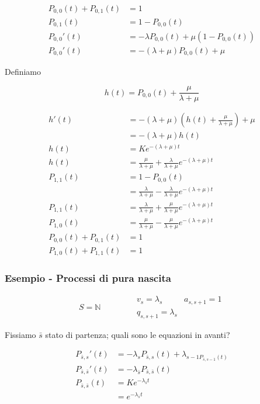 \documentclass[a4paper,12pt]{book}
\begin{document}
\begin{align*}
	P_{0,0}(t) + P_{0,1}(t) & = 1 \\
	P_{0,1}(t) & = 1 - P_{0,0}(t) \\
	P_{0,0}'(t) & = - \lambda P_{0,0}(t) + \mu(1 - P_{0,0}(t)) \\
	P_{0,0}'(t) & = -(\lambda + \mu)P_{0,0}(t) + \mu
\end{align*}

Definiamo 

$$ h(t) = P_{0,0}(t) + \frac{\mu}{\lambda + \mu} $$

\begin{align*}
	h'(t) & = -(\lambda + \mu)(h(t) + \frac{\mu}{\lambda + \mu}) + \mu \\
	& = -(\lambda + \mu) h(t) \\
	h(t) & = Ke^{-(\lambda + \mu)t} \\
	h(t) & = \frac{\mu}{\lambda + \mu} + \frac{\lambda}{\lambda + \mu}e^{-(\lambda + \mu)t} \\
	P_{1,1}(t) & = 1 - P_{0,0}(t) \\
	& = \frac{\lambda}{\lambda + \mu} - \frac{\lambda}{\lambda + \mu} e^{-(\lambda + \mu)t} \\
	P_{1,1}(t) & = \frac{\lambda}{\lambda + \mu} + \frac{\mu}{\lambda + \mu}e^{-(\lambda + \mu)t} \\
	P_{1,0}(t) & = \frac{\mu}{\lambda + \mu} - \frac{\mu}{\lambda + \mu}e^{-(\lambda + \mu)t} \\
	P_{0,0}(t) + P_{0,1}(t) & = 1 \\
	P_{1,0}(t) + P_{1,1}(t) & = 1
\end{align*}

\subsubsection{Esempio - Processi di pura nascita}

$$ S = \mathbb{N} \qquad \qquad \begin{array}{cc}
	v_s = \lambda_s & a_{s,s+1} = 1 \\
	q_{s,s+1} = \lambda_s
\end{array}$$

Fissiamo $ \bar{s} $ stato di partenza; quali sono le equazioni in avanti?

\begin{align*}
	P_{\bar{s},s}'(t) & = -\lambda_s P_{\bar{s},s}(t) + \lambda_{s-1P_{\bar{s},s-1}(t)} \\
	P_{\bar{s},\bar{s}}'(t) & = -\lambda_{\bar{s}} P_{\bar{s},\bar{s}}(t) \\ %
	P_{\bar{s},\bar{s}}(t) & = Ke^{-\lambda_{\bar{s}}t} \\
	& = e^{-\lambda_{\bar{s}} t}
\end{align*}
\end{document}
